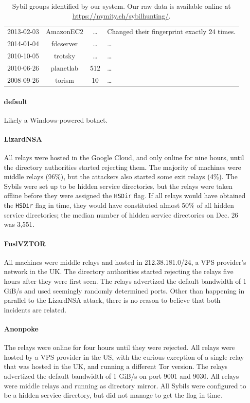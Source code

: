 \begin{table}[t]
\begin{tabular}{l c c p{10cm}}
2013-02-03 & AmazonEC2 & \ldots & Changed their fingerprint exactly 24 times. \\
2014-01-04 & fdcserver & \ldots & \ldots \\
2010-10-05 & trotsky & \ldots & \ldots \\
2010-06-26 & planetlab & 512 & \ldots \\
2008-09-26 & torism & 10 & \ldots \\
\end{tabular}
\caption{Sybil groups identified by our system.  Our raw data is available
online at {\normalfont\url{https://nymity.ch/sybilhunting/}}.}
\label{tab:sybils}
\end{table}

\paragraph{default}
Likely a Windows-powered botnet.

\paragraph{LizardNSA}
All relays were hosted in the Google Cloud, and only online for nine hours,
until the directory authorities started rejecting them.  The majority of
machines were middle relays (96\%), but the attackers also started some exit
relays (4\%).  The Sybils were set up to be hidden service directories, but the
relays were taken offline before they were assigned the \texttt{HSDir} flag.  If
all relays would have obtained the \texttt{HSDir} flag in time, they would have
constituted almost 50\% of all hidden service directories; the median number of
hidden service directories on Dec. 26 was 3,551.

\paragraph{FuslVZTOR}
All machines were middle relays and hosted in 212.38.181.0/24, a VPS provider's
network in the UK.  The directory authorities started rejecting the relays five
hours after they were first seen.  The relays advertized the default bandwidth
of 1 GiB/s and used seemingly randomly determined ports.  Other than happening
in parallel to the LizardNSA attack, there is no reason to believe that both
incidents are related.

\paragraph{Anonpoke}
The relays were online for four hours until they were rejected.  All relays were
hosted by a VPS provider in the US, with the curious exception of a single relay
that was hosted in the UK, and running a different Tor version.  The relays
advertized the default bandwidth of 1 GiB/s on port 9001 and 9030.  All relays
were middle relays and running as directory mirror.  All Sybils were configured
to be a hidden service directory, but did not manage to get the flag in time.

